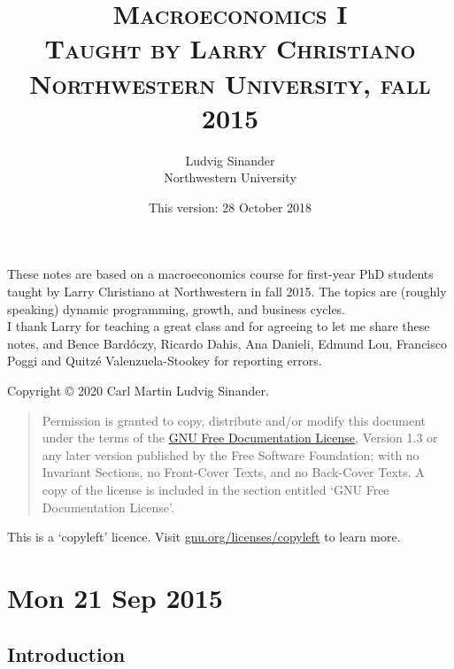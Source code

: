 \documentclass[11pt,letterpaper,reqno,oneside]{article}
\title{\scshape Macroeconomics I \\
	\vspace{0.5em}
	\large \scshape Taught by Larry Christiano \\
	\large \scshape Northwestern University, fall 2015}
\author{Ludvig Sinander \\ Northwestern University}
\date{\small This version: 28 October 2018}
\begin{document}
\maketitle


\noindent
These notes are based on a macroeconomics course for first-year PhD students taught by Larry Christiano at Northwestern in fall 2015. The topics are (roughly speaking) dynamic programming, growth, and business cycles.\\

\noindent
I thank Larry for teaching a great class and for agreeing to let me share these notes,
and Bence Bardóczy, Ricardo Dahis, Ana Danieli, Edmund Lou, Francisco Poggi and Quitzé Valenzuela-Stookey for reporting errors.



\pagebreak
\hspace{1pt}\vfill
\noindent
Copyright \copyright{} 2020 Carl Martin Ludvig Sinander.

\begin{quotation}
\noindent
Permission is granted to copy, distribute and/or modify this document under the terms of the \href{https://www.gnu.org/licenses/fdl}{GNU Free Documentation License}, Version 1.3 or any later version published by the Free Software Foundation; with no Invariant Sections, no Front-Cover Texts, and no Back-Cover Texts. A copy of the license is included in the section entitled `GNU
Free Documentation License'.
\end{quotation}

\noindent
This is a `copyleft' licence.
Visit \href{https://www.gnu.org/licenses/copyleft}{gnu.org/licenses/copyleft} to learn more.



\pagebreak
{}
\tableofcontents
{}



\pagebreak
\section{Mon 21 Sep 2015}
\label{sec:21Sep2015}


\subsection{Introduction}
\label{sec:21Sep2015:intro}
\end{document}
